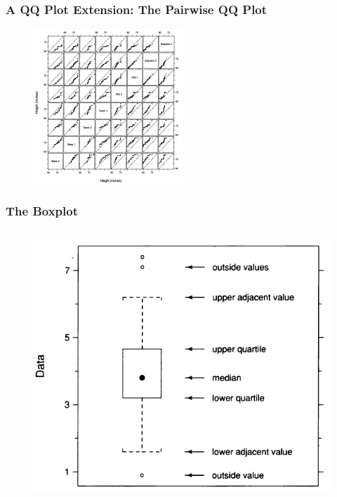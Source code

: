 \documentclass[aspectratio=1610]{beamer}
\begin{document}
\begin{frame}
	\frametitle{A QQ Plot Extension: The Pairwise QQ Plot}
	\begin{figure}
		\begin{center}
			\includegraphics[width=0.5\textwidth]{figures/pairwise_qq_plot.png}
		\end{center}
	\end{figure}
\end{frame}

\begin{frame}
	\frametitle{The Boxplot}
	\begin{columns}
		\begin{figure}
			\begin{center}
				\includegraphics[width=1.0\textwidth]{figures/boxplot.png}
			\end{center}
		\end{figure}
	\end{columns}
\end{frame}
\end{document}
